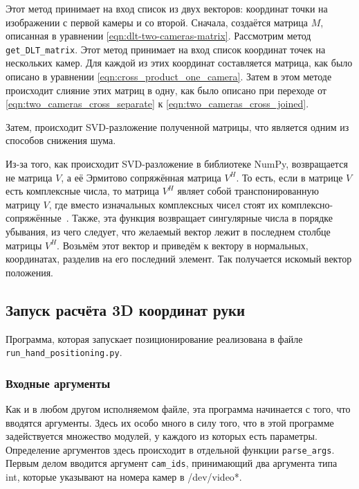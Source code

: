 \documentclass[14pt, a4paper]{extarticle}
\begin{document}
Этот метод принимает на вход список из двух векторов: координат точки на
изображении с первой камеры и со второй.
Сначала, создаётся матрица $M$, описанная в уравнении
\eqref{eqn:dlt-two-cameras-matrix}. 
Рассмотрим метод \texttt{get\_DLT\_matrix}. Этот метод принимает на вход список
координат точек на нескольких камер. Для каждой из этих координат составляется
матрица, как было описано в уравнении \eqref{eqn:cross_product_one_camera}.
Затем в этом методе происходит слияние этих матриц в одну, как было описано при
переходе от \eqref{eqn:two_cameras_cross_separate} к
\eqref{eqn:two_cameras_cross_joined}.

Затем, происходит SVD-разложение полученной матрицы, что является одним из
способов снижения шума.

Из-за того, как происходит SVD-разложение в библиотеке NumPy, возвращается не
матрица $V$, а её Эрмитово сопряжённая матрица $V^H$. То есть, если в матрице
$V$ есть комплексные числа, то матрица $V^H$ являет собой транспонированную
матрицу $V$, где вместо изначальных комплексных чисел стоят их
комплексно-сопряжённые~\cite{numpy_svd}. Также, эта функция возвращает
сингулярные числа в порядке убывания, из чего следует, что желаемый вектор
лежит в последнем столбце матрицы $V^H$. Возьмём этот вектор и приведём к вектору в
нормальных, координатах, разделив на его последний элемент. Так получается
искомый вектор положения.

\subsection{Запуск расчёта 3D координат руки}
Программа, которая запускает позиционирование реализована в файле\\
\texttt{run\_hand\_positioning.py}.

\subsubsection{Входные аргументы}
Как и в любом другом исполняемом файле, эта программа начинается с того, что
вводятся аргументы. Здесь их особо много в силу того, что в этой программе
задействуется множество модулей, у каждого из которых есть параметры.
Определение аргументов здесь происходит в отдельной функции
\texttt{parse\_args}.
Первым делом вводится аргумент \texttt{cam\_ids}, принимающий два аргумента
типа int, которые указывают на номера камер в /dev/video*.
\end{document}
